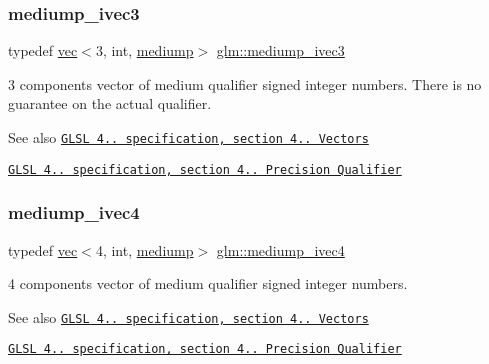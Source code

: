 \subsubsection{\texorpdfstring{mediump\+\_\+ivec3}{mediump\_ivec3}}
{\footnotesize\ttfamily typedef \mbox{\hyperlink{structglm_1_1vec}{vec}}$<$3, int, \mbox{\hyperlink{namespaceglm_a36ed105b07c7746804d7fdc7cc90ff25a6416f3ea0c9025fb21ed50c4d6620482}{mediump}}$>$ \mbox{\hyperlink{group__core__precision_ga33f150e1d55aa6c91927cb0431bf0708}{glm\+::mediump\+\_\+ivec3}}}

3 components vector of medium qualifier signed integer numbers. There is no guarantee on the actual qualifier.

\begin{DoxySeeAlso}{See also}
\href{http://www.opengl.org/registry/doc/GLSLangSpec.4.20.8.pdf}{\tt G\+L\+SL 4.. specification, section 4.. Vectors} 

\href{http://www.opengl.org/registry/doc/GLSLangSpec.4.20.8.pdf}{\tt G\+L\+SL 4.. specification, section 4.. Precision Qualifier} 
\end{DoxySeeAlso}
\mbox{\label{group__core__precision_gada31c3570b58a80e616c7245726a210d}} 
\subsubsection{\texorpdfstring{mediump\+\_\+ivec4}{mediump\_ivec4}}
{\footnotesize\ttfamily typedef \mbox{\hyperlink{structglm_1_1vec}{vec}}$<$4, int, \mbox{\hyperlink{namespaceglm_a36ed105b07c7746804d7fdc7cc90ff25a6416f3ea0c9025fb21ed50c4d6620482}{mediump}}$>$ \mbox{\hyperlink{group__core__precision_gada31c3570b58a80e616c7245726a210d}{glm\+::mediump\+\_\+ivec4}}}

4 components vector of medium qualifier signed integer numbers.

\begin{DoxySeeAlso}{See also}
\href{http://www.opengl.org/registry/doc/GLSLangSpec.4.20.8.pdf}{\tt G\+L\+SL 4.. specification, section 4.. Vectors} 

\href{http://www.opengl.org/registry/doc/GLSLangSpec.4.20.8.pdf}{\tt G\+L\+SL 4.. specification, section 4.. Precision Qualifier} 
\end{DoxySeeAlso}
\mbox{\label{group__core__precision_ga698131fdb127cb55e8b70cc1b2c4ff67}} 
